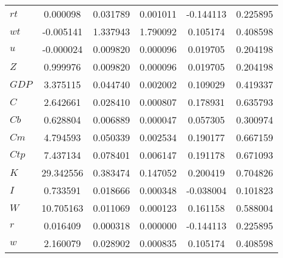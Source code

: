 \begin{center}
\begin{longtable}{lccccc}
$rt        $	 & 	        0.000098	 & 	        0.031789	 & 	        0.001011	 & 	       -0.144113	 & 	        0.225895 \\ 
$wt        $	 & 	       -0.005141	 & 	        1.337943	 & 	        1.790092	 & 	        0.105174	 & 	        0.408598 \\ 
$u         $	 & 	       -0.000024	 & 	        0.009820	 & 	        0.000096	 & 	        0.019705	 & 	        0.204198 \\ 
$Z         $	 & 	        0.999976	 & 	        0.009820	 & 	        0.000096	 & 	        0.019705	 & 	        0.204198 \\ 
$GDP       $	 & 	        3.375115	 & 	        0.044740	 & 	        0.002002	 & 	        0.109029	 & 	        0.419337 \\ 
$C         $	 & 	        2.642661	 & 	        0.028410	 & 	        0.000807	 & 	        0.178931	 & 	        0.635793 \\ 
$Cb        $	 & 	        0.628804	 & 	        0.006889	 & 	        0.000047	 & 	        0.057305	 & 	        0.300974 \\ 
$Cm        $	 & 	        4.794593	 & 	        0.050339	 & 	        0.002534	 & 	        0.190177	 & 	        0.667159 \\ 
$Ctp       $	 & 	        7.437134	 & 	        0.078401	 & 	        0.006147	 & 	        0.191178	 & 	        0.671093 \\ 
$K         $	 & 	       29.342556	 & 	        0.383474	 & 	        0.147052	 & 	        0.200419	 & 	        0.704826 \\ 
$I         $	 & 	        0.733591	 & 	        0.018666	 & 	        0.000348	 & 	       -0.038004	 & 	        0.101823 \\ 
$W         $	 & 	       10.705163	 & 	        0.011069	 & 	        0.000123	 & 	        0.161158	 & 	        0.588004 \\ 
$r         $	 & 	        0.016409	 & 	        0.000318	 & 	        0.000000	 & 	       -0.144113	 & 	        0.225895 \\ 
$w         $	 & 	        2.160079	 & 	        0.028902	 & 	        0.000835	 & 	        0.105174	 & 	        0.408598 \\ 
\end{longtable}
 \end{center}
